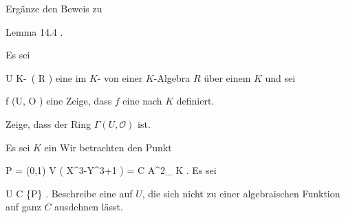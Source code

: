 {}
{





Ergänze den Beweis zu

Lemma 14.4
.





}
{} {}

{}
{





Es sei

\mavergleichskette
{\vergleichskette
{ U
}
{ \subseteq }{  K\!-\!\, \left(  R  \right)
}
{  }{
}
{    }{
}
{   }{
}
}
{}{}{}
eine
im
$K$-
von einer $K$-Algebra $R$ über einem
$K$ und sei

\mavergleichskette
{\vergleichskette
{ f
}
{ \in }{ \Gamma (U, {\mathcal O} )
}
{  }{
}
{    }{
}
{   }{
}
}
{}{}{}
eine
Zeige, dass $f$ eine
nach $K$ definiert.





}
{} {}

{}
{





Zeige, dass der Ring $\Gamma (U, {\mathcal O} )$
ist.





}
{} {}

{}
{





Es sei $K$ ein
Wir betrachten den  Punkt

\mavergleichskettedisp
{\vergleichskette
{ P
}
{ =} { (0,1)
}
{ \in} { V \left(  X^3-Y^3+1  \right)
}
{ =} { C
}
{ \subseteq} { {\mathbb A}^{2}_{ K }
}
}
{}{}{.}
Es sei

\mavergleichskette
{\vergleichskette
{ U
}
{  }{ C \setminus \{P\}
}
{  }{
}
{    }{
}
{   }{
}
}
{}{}{.}
Beschreibe eine
auf $U$, die sich nicht zu einer algebraischen Funktion auf ganz $C$ ausdehnen lässt.





}
{} {}

